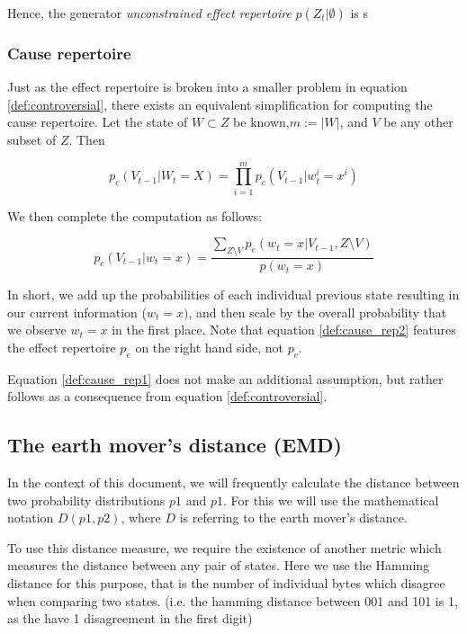 Hence, the generator \textit{unconstrained effect repertoire} $p(Z_t | \emptyset)$ is s

\subsubsection{Cause repertoire}

Just as the effect repertoire is broken into a smaller problem in equation \ref{def:controversial}, there exists an equivalent simplification for computing the cause repertoire. Let the state of $W \subset Z$ be known,$m:=|W|$, and $V$ be any other subset of $Z$. Then 

\begin{equation}
\label{def:cause_rep1}
p_c(V_{t-1} | W_t=X) = \prod \limits_{i = 1}^{m} p_c(V_{t-1}|w^i_{t} = x^i)
\end{equation}

We then complete the computation as follows:

\begin{equation}
\label{def:cause_rep2}
p_c(V_{t-1}| w_t = x) = \frac{\sum \limits_{Z\setminus V} p_e(w_t = x| V_{t-1}, Z \setminus V)}{p(w_t = x)}
\end{equation}

In short, we add up the probabilities of each individual previous state resulting in our current information ($w_t = x)$, and then scale by the overall probability that we observe $w_t = x$ in the first place. Note that equation \ref{def:cause_rep2} features the effect repertoire $p_e$ on the right hand side, not $p_c$.

\begin{remark}
	Equation \ref{def:cause_rep1} does not make an additional assumption, but rather follows as a consequence from equation \ref{def:controversial}.
\end{remark}



\subsection{The earth mover's distance (EMD)}
In the context of this document, we will frequently calculate the distance between two probability distributions $p1$ and $p1$. For this we will use the mathematical notation $D(p1,p2)$, where $D$ is referring to the earth mover's distance.

To use this distance measure, we require the existence of another metric which measures the distance between any pair of states. Here we use the Hamming distance for this purpose, that is the number of individual bytes which disagree when comparing two states. (i.e. the hamming distance between 001 and 101 is 1, as the have 1 disagreement in the first digit)

